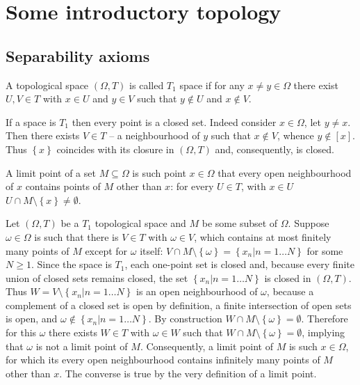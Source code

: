 \documentclass[a4paper]{article}
\newcommand{\obj}[1]{\left\{{#1}\right\}}
\newcommand{\clo}[1]{\left [{#1}\right]}
\newcommand{\brac}[1]{{\left({#1}\right)}}
\begin{document}


\section{Some introductory topology} %
\label{sec:some_introductory_topology}
\subsection{Separability axioms} %
\label{sub:separability_axioms}
A topological space $\brac{\Omega, T}$ is called $T_1$ space if for any $x\neq y\in \Omega$ there exist $U,V\in T$ with $x\in U$ and $y\in V$ such that $y\notin U$ and $x\notin V$.

If a space is $T_1$ then every point is a closed set. Indeed consider $x\in \Omega$, let $y\neq x$. Then there exists $V\in T$ -- a neighbourhood of $y$ such that $x\notin V$, whence $y\notin \clo{x}$. Thus $\obj{x}$ coincides with its closure in $\brac{\Omega, T}$ and, consequently, is closed.

A limit point of a set $M\subseteq \Omega$ is such point $x\in \Omega$ that every open neighbourhood of $x$ contains points of $M$ other than $x$: for every $U\in T$, with $x\in U$ $U\cap M\setminus \obj{x}\neq \emptyset$.

Let $\brac{\Omega, T}$ be a $T_1$ topological space and $M$ be some subset of $\Omega$. Suppose $\omega\in \Omega$ is such that there is $V\in T$ with $\omega\in V$, which contains at most finitely many points of $M$ except for $\omega$ itself: $V\cap M\setminus \obj{\omega} = \obj{x_n\vert n=1\ldots N}$ for some $N\geq 1$. Since the space is $T_1$, each one-point set is closed and, because every finite union of closed sets remains closed, the set $\obj{x_n\vert n=1\ldots N}$ is closed in $\brac{\Omega, T}$. Thus $W=V\setminus \obj{x_n\vert n=1\ldots N}$ is an open neighbourhood of $\omega$, because a complement of a closed set is open by definition, a finite intersection of open sets is open, and $\omega\notin \obj{x_n\vert n=1\ldots N}$. By construction $W\cap M\setminus\obj{\omega} = \emptyset$. Therefore for this $\omega$ there exists $W\in T$ with $\omega\in W$ such that $W\cap M\setminus \obj{\omega} = \emptyset$, implying that $\omega$ is not a limit point of $M$.
Consequently, a limit point of $M$ is such $x\in \Omega$, for which its every open neighbourhood contains infinitely many points of $M$ other than $x$. The converse is true by the very definition of a limit point.
\end{document}
